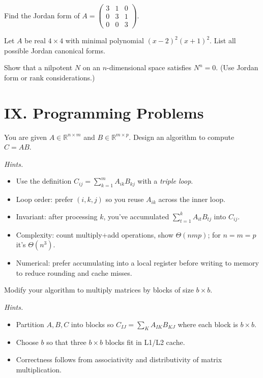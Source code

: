 \documentclass[11pt]{article}
\begin{document}
\begin{problem}
Find the Jordan form of $A=\begin{pmatrix}3&1&0\\0&3&1\\0&0&3\end{pmatrix}$.
\end{problem}

\begin{problem}
Let $A$ be real $4\times 4$ with minimal polynomial $(x-2)^2(x+1)^2$. List all possible Jordan canonical forms.
\end{problem}

\begin{problem}
Show that a nilpotent $N$ on an $n$-dimensional space satisfies $N^n=0$. (Use Jordan form or rank considerations.)
\end{problem}
\section*{IX. Programming Problems}

\begin{problem}
You are given $A\in\mathbb{R}^{n\times m}$ and $B\in\mathbb{R}^{m\times p}$. Design an algorithm to compute $C=AB$.

\textit{Hints.}
\begin{itemize}
  \item Use the definition $C_{ij}=\sum_{k=1}^m A_{ik}B_{kj}$ with a \emph{triple loop}.
  \item Loop order: prefer $(i,k,j)$ so you reuse $A_{ik}$ across the inner loop.
  \item Invariant: after processing $k$, you’ve accumulated $\sum_{t=1}^k A_{it}B_{tj}$ into $C_{ij}$.
  \item Complexity: count multiply+add operations, show $\Theta(nmp)$; for $n=m=p$ it’s $\Theta(n^3)$.
  \item Numerical: prefer accumulating into a local register before writing to memory to reduce rounding and cache misses.
\end{itemize}
\end{problem}

\begin{problem}
Modify your algorithm to multiply matrices by blocks of size $b\times b$.

\textit{Hints.}
\begin{itemize}
  \item Partition $A,B,C$ into blocks so $C_{IJ}=\sum_K A_{IK}B_{KJ}$ where each block is $b\times b$.
  \item Choose $b$ so that three $b\times b$ blocks fit in L1/L2 cache.
  \item Correctness follows from associativity and distributivity of matrix multiplication.
\end{itemize}
\end{problem}
\end{document}
